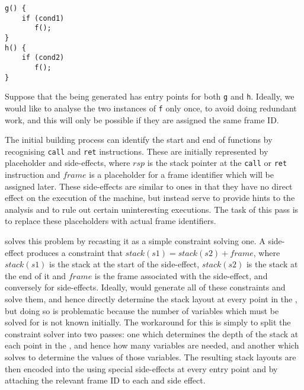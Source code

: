 \begin{verbatim}
g() {
    if (cond1)
       f();
}
h() {
    if (cond2)
       f();
}
\end{verbatim}

Suppose that the {\StateMachine} being generated has entry points for
both \verb|g| and \verb|h|.  Ideally, we would like to analyse the two
instances of \verb|f| only once, to avoid doing redundant work, and
this will only be possible if they are assigned the same frame ID.

The initial {\StateMachine} building process can identify the start
and end of functions by recognising \verb|call| and \verb|ret|
instructions.  These are initially represented by placeholder
 and  side-effects, where $rsp$ is the stack pointer at the
\verb|call| or \verb|ret| instruction and $frame$ is a placeholder for
a frame identifier which will be assigned later.  These side-effects
are similar to  ones in that they have no direct effect
on the execution of the machine, but instead serve to provide hints to
the analysis and to rule out certain uninteresting executions.  The
task of this pass is to replace these placeholders with actual frame
identifiers.

{\Technique} solves this problem by recasting it as a simple
constraint solving one.  A  side-effect
produces a constraint that $stack(s1) = stack(s2) + frame$, where
$stack(s1)$ is the stack at the start of the side-effect, $stack(s2)$
is the stack at the end of it and $frame$ is the frame associated with
the side-effect, and conversely for  side-effects.
Ideally, {\Technique} would generate all of these constraints and
solve them, and hence directly determine the stack layout at every
point in the {\StateMachine}, but doing so is problematic because the
number of variables which must be solved for is not known initially.
The workaround for this is simply to split the constraint solver into
two passes: one which determines the depth of the stack at each point
in the \StateMachine, and hence how many variables are needed, and
another which solves to determine the values of those variables.  The
resulting stack layouts are then encoded into the {\StateMachine}
using special  side-effects at every entry point
and by attaching the relevant frame ID to each 
and  side effect.

